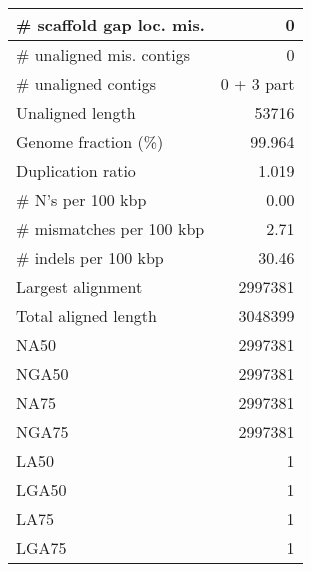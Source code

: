 \documentclass[12pt,a4paper]{article}
\begin{document}
\begin{table}[ht]
\begin{center}
\begin{tabular}{|l*{1}{|r}|}
\# scaffold gap loc. mis. & 0 \\ \hline
\# unaligned mis. contigs & 0 \\ \hline
\# unaligned contigs & 0 + 3 part \\ \hline
Unaligned length & 53716 \\ \hline
Genome fraction (\%) & 99.964 \\ \hline
Duplication ratio & 1.019 \\ \hline
\# N's per 100 kbp & 0.00 \\ \hline
\# mismatches per 100 kbp & 2.71 \\ \hline
\# indels per 100 kbp & 30.46 \\ \hline
Largest alignment & 2997381 \\ \hline
Total aligned length & 3048399 \\ \hline
NA50 & 2997381 \\ \hline
NGA50 & 2997381 \\ \hline
NA75 & 2997381 \\ \hline
NGA75 & 2997381 \\ \hline
LA50 & 1 \\ \hline
LGA50 & 1 \\ \hline
LA75 & 1 \\ \hline
LGA75 & 1 \\ \hline
\end{tabular}
\end{center}
\end{table}
\end{document}

